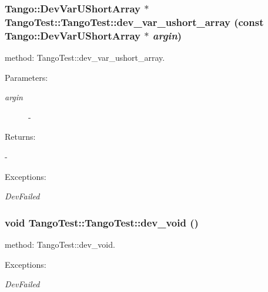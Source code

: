 \subsubsection{\setlength{\rightskip}{0pt plus 5cm}Tango::Dev\-Var\-UShort\-Array $\ast$ Tango\-Test::Tango\-Test::dev\_\-var\_\-ushort\_\-array (const Tango::Dev\-Var\-UShort\-Array $\ast$ {\em argin})}\label{classTangoTest_1_1TangoTest_z5_14}


method: Tango\-Test::dev\_\-var\_\-ushort\_\-array.

\begin{Desc}
\item[Parameters: ]\par
\begin{description}
\item[{\em 
argin}]- \end{description}
\end{Desc}
\begin{Desc}
\item[Returns: ]\par
- \end{Desc}
\begin{Desc}
\item[Exceptions: ]\par
\begin{description}
\item[{\em 
Dev\-Failed}] \end{description}
\end{Desc}
\subsubsection{\setlength{\rightskip}{0pt plus 5cm}void Tango\-Test::Tango\-Test::dev\_\-void ()}\label{classTangoTest_1_1TangoTest_z5_3}


method: Tango\-Test::dev\_\-void.

\begin{Desc}
\item[Exceptions: ]\par
\begin{description}
\item[{\em 
Dev\-Failed}] \end{description}
\end{Desc}
